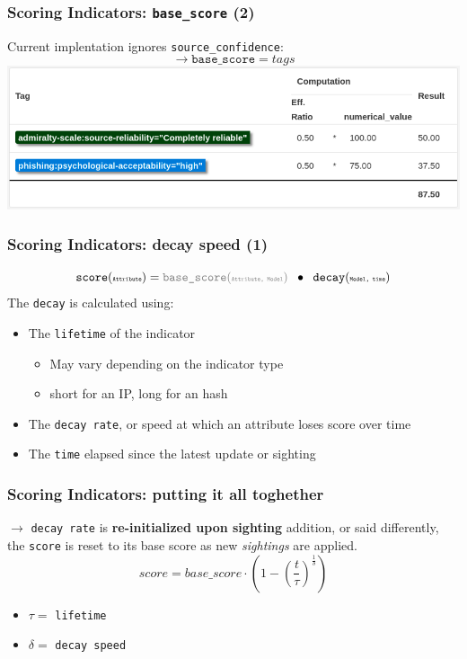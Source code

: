 \begin{frame}
    \frametitle{Scoring Indicators: \texttt{base\_score} (2)}
    Current implentation ignores \texttt{source\_confidence}:
    $$\rightarrow \texttt{base\_score} = tags$$
    \includegraphics[width=1.0\linewidth]{pics/bs-computation-steps.png}
\end{frame}

\begin{frame}
    \frametitle{Scoring Indicators: decay speed (1)}
    $$ \texttt{score}(\texttt{\tiny Attribute}) = {\color{gray}\texttt{base\_score}(\texttt{\tiny Attribute, Model})} \;\;\bullet\;\; \texttt{decay}(\texttt{\tiny Model, time}) $$
    The \texttt{decay} is calculated using:
   \begin{itemize}
       \item The \texttt{lifetime} of the indicator
       \begin{itemize}
           \item May vary depending on the indicator type
           \item short for an IP, long for an hash
       \end{itemize}
       \item The \texttt{decay rate}, or speed at which an attribute loses score over time
       \item The \texttt{time} elapsed since the latest update or sighting
   \end{itemize}
\end{frame}

\begin{frame}
    \frametitle{Scoring Indicators: putting it all toghether}
    $\rightarrow$ \texttt{decay rate} is \textbf{re-initialized upon sighting} addition, or said differently, the \texttt{score} is reset to its base score as new \textit{sightings} are applied.
    $$score = base\_score \cdot \left( 1 - \left( \frac{t}{\tau} \right)^{\frac{1}{\delta}} \right) $$
    \begin{itemize}
        \item $\tau = $ \texttt{lifetime}
        \item $\delta = $ \texttt{decay speed}
    \end{itemize}
\end{frame}

